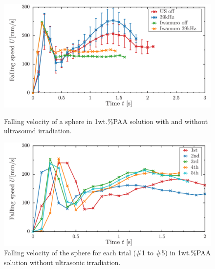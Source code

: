 \begin{figure}[ht]
    \centering
    \includegraphics[width=12cm,clip]{./4-Results/s1.png}
    \caption{Falling velocity of a sphere in 1wt.\%PAA solution with and without ultrasound irradiation.}
    \label{fig:1PAA-falling}
    \centering
    \includegraphics[width=12cm,clip]{4-Results/s1-1-5.png}
    \caption{Falling velocity of the sphere for each trial (\#1 to \#5) in 1wt.\%PAA solution without ultrasonic irradiation.}
    \label{fig:1PAA-falling1-5}
\end{figure}
